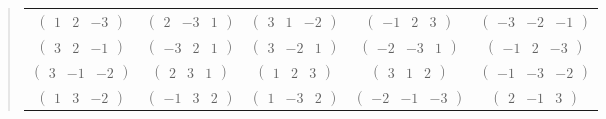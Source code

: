 \documentclass[fleqn,9pt,landscape]{jsarticle}
\begin{document}
\begin{quote}
\begin{tabular}{ccccc}
$ \begin{pmatrix} 1 & 2 & -3 \end{pmatrix} $ & $ \begin{pmatrix} 2 & -3 & 1 \end{pmatrix} $ & $ \begin{pmatrix} 3 & 1 & -2 \end{pmatrix} $ & $ \begin{pmatrix} -1 & 2 & 3 \end{pmatrix} $ & $ \begin{pmatrix} -3 & -2 & -1 \end{pmatrix} $ \\
$ \begin{pmatrix} 3 & 2 & -1 \end{pmatrix} $ & $ \begin{pmatrix} -3 & 2 & 1 \end{pmatrix} $ & $ \begin{pmatrix} 3 & -2 & 1 \end{pmatrix} $ & $ \begin{pmatrix} -2 & -3 & 1 \end{pmatrix} $ & $ \begin{pmatrix} -1 & 2 & -3 \end{pmatrix} $ \\
$ \begin{pmatrix} 3 & -1 & -2 \end{pmatrix} $ & $ \begin{pmatrix} 2 & 3 & 1 \end{pmatrix} $ & $ \begin{pmatrix} 1 & 2 & 3 \end{pmatrix} $ & $ \begin{pmatrix} 3 & 1 & 2 \end{pmatrix} $ & $ \begin{pmatrix} -1 & -3 & -2 \end{pmatrix} $ \\
$ \begin{pmatrix} 1 & 3 & -2 \end{pmatrix} $ & $ \begin{pmatrix} -1 & 3 & 2 \end{pmatrix} $ & $ \begin{pmatrix} 1 & -3 & 2 \end{pmatrix} $ & $ \begin{pmatrix} -2 & -1 & -3 \end{pmatrix} $ & $ \begin{pmatrix} 2 & -1 & 3 \end{pmatrix} $ \\

\end{tabular}
\end{quote}
\end{document}
